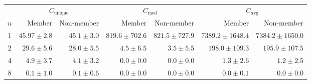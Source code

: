  \begin{tabular}{c@{\hskip 15pt}rr@{\hskip 10pt}rr@{\hskip 10pt}rr}
    \toprule
     & \multicolumn{2}{c}{$C_\textrm{unique}$} & \multicolumn{2}{c}{$C_\textrm{med}$} & \multicolumn{2}{c}{$C_\textrm{avg}$} \\
     \cmidrule(lr){2-3} \cmidrule(lr){4-5} \cmidrule(lr){6-7}
     $n$ & Member & Non-member & Member & Non-member & Member & Non-member \\
     \midrule
     1 & $45.97\pm 2.8$ & $45.1\pm 3.0$ & $819.6\pm 702.6$ & $821.5\pm 727.9$ & $7389.2\pm 1648.4$ & $7384.2\pm 1650.0$  \\ 
     2 & $29.6\pm 5.6$ & $28.0\pm 5.5$ & $4.5\pm 6.5$ & $3.5\pm 5.5$ & $198.0\pm 109.3$ & $195.9\pm107.5$\\ 
     4 & $4.9\pm 3.7$ & $4.1\pm 3.2$ & $0.0\pm 0.0$ & $0.0\pm 0.0$ & $1.3\pm 2.6$ & $1.2\pm 2.5$ \\ 
     8 & $0.1\pm 1.0$ & $0.1\pm 0.6$ & $0.0\pm 0.0$ & $0.0\pm 0.0$ & $0.0\pm 0.1$ & $0.0\pm 0.0$ \\ 
     \bottomrule
 \end{tabular}
